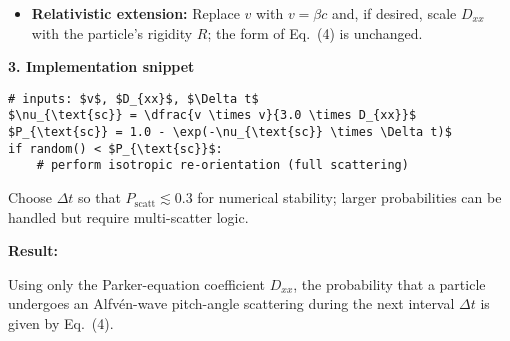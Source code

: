 \begin{tcolorbox}[colback=white, colframe=black, title={From Parker‐Equation Transport Coefficient $D_{xx}$ to a Monte-Carlo Scattering Probability}, fonttitle=\bfseries]
\begin{itemize}
  \item \textbf{Relativistic extension:} Replace $v$ with $v = \beta c$ and, if desired, scale $D_{xx}$ with the particle’s rigidity $R$; the form of Eq.~(4) is unchanged.
\end{itemize}

\medskip

\textbf{3. Implementation snippet}
\begin{lstlisting}[mathescape=true, basicstyle=\ttfamily\small]
# inputs: $v$, $D_{xx}$, $\Delta t$
$\nu_{\text{sc}} = \dfrac{v \times v}{3.0 \times D_{xx}}$
$P_{\text{sc}} = 1.0 - \exp(-\nu_{\text{sc}} \times \Delta t)$
if random() < $P_{\text{sc}}$:
    # perform isotropic re-orientation (full scattering)
\end{lstlisting}


Choose $\Delta t$ so that $P_{\text{scatt}} \lesssim 0.3$ for numerical stability; larger probabilities can be handled but require multi-scatter logic.

\medskip

\textbf{Result:}

Using only the Parker-equation coefficient $D_{xx}$, the probability that a particle undergoes an Alfvén-wave pitch-angle scattering during the next interval $\Delta t$ is given by Eq.~(4).

\end{tcolorbox}


